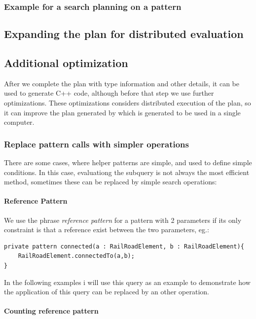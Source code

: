 \subsubsection{Example for a search planning on a pattern }



\subsection{Expanding the plan for distributed evaluation}


\subsection{Additional optimization}

After we complete the plan with type information and other details, it can be used to generate C++ code, although before that step we use further optimizations. 
These optimizations considers distributed execution of the plan, so it can improve the plan generated by \viatra{} which is generated to be used in a single computer.


\subsubsection{Replace pattern calls with simpler operations}
There are some cases, where helper patterns are simple, and used to define simple conditions. 
In this case, evaluationg the subquery is not always the most efficient method, sometimes these can be replaced by simple search operations:

\paragraph{Reference Pattern}
We use the phrase \emph{reference pattern} for a pattern with 2 parameters if its only constraint is that a reference exist between the two parameters, eg.:
\begin{lstlisting}[language = vql]
private pattern connected(a : RailRoadElement, b : RailRoadElement){
	RailRoadElement.connectedTo(a,b);
}
\end{lstlisting}

In the following examples i will use this query as an example to demonstrate how the application of this query can be replaced by an other operation.

\paragraph{Counting reference pattern} 

